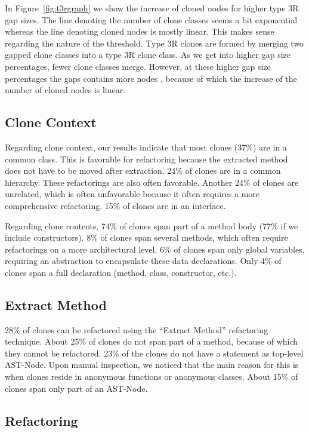 In Figure~\ref{fig:t3rgraph} we show the increase of cloned nodes for higher type 3R gap sizes. The line denoting the number of clone classes seems a bit exponential whereas the line denoting cloned nodes is mostly linear. This makes sense regarding the nature of the threshold. Type 3R clones are formed by merging two gapped clone classes into a type 3R clone class. As we get into higher gap size percentages, fewer clone classes merge. However, at these higher gap size percentages the gaps contains more nodes , because of which the increase of the number of cloned nodes is linear.

\subsection{Clone Context}
Regarding clone context, our results indicate that most clones (37\%) are in a common class. This is favorable for refactoring because the extracted method does not have to be moved after extraction. 24\% of clones are in a common hierarchy. These refactorings are also often favorable. Another 24\% of clones are unrelated, which is often unfavorable because it often requires a more comprehensive refactoring. 15\% of clones are in an interface.

Regarding clone contents, 74\% of clones span part of a method body (77\% if we include constructors). 8\% of clones span several methods, which often require refactorings on a more architectural level. 6\% of clones span only global variables, requiring an abstraction to encapsulate these data declarations. Only 4\% of clones span a full declaration (method, class, constructor, etc.).

\subsection{Extract Method}
28\% of clones can be refactored using the ``Extract Method'' refactoring technique. About 25\% of clones do not span part of a method, because of which they cannot be refactored. 23\% of the clones do not have a statement as top-level AST-Node. Upon manual inspection, we noticed that the main reason for this is when clones reside in anonymous functions or anonymous classes. About 15\% of clones span only part of an AST-Node.

\subsection{Refactoring}

